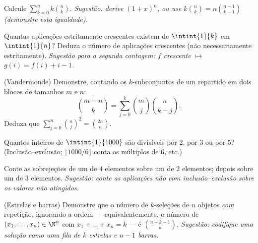 \begin{exercise}[$\star$]\label{exo:b1:counting:5}
Calcule $\sum_{k=0}^{n} k \binom{n}{k}$. \emph{Sugestão: derive
$(1 + x)^n$, ou use $k \binom nk = n \binom{n-1}{k-1}$ (demonstre esta igualdade).}
\end{exercise}

\begin{exercise}[$\star\star$]\label{exo:b1:counting:6}
Quantas aplicações estritamente crescentes existem de $\intint{1}{k}$ em $\intint{1}{n}$? Deduza o número de aplicações
crescentes (não necessariamente estritamente). \emph{Sugestão para a
segunda contagem: $f$ crescente $\mapsto$ $g(i) = f(i) + i - 1$.}
\end{exercise}

\begin{exercise}[$\star\star$]\label{exo:b1:counting:7}
(Vandermonde) Demonstre, contando os $k$-subconjuntos de um 
repartido em dois blocos de tamanhos $m$ e $n$:
\[
\binom{m+n}{k} = \sum_{j=0}^{k} \binom{m}{j} \binom{n}{k-j} .
\]
Deduza que $\sum_{j=0}^{n} \binom nj^2 = \binom{2n}{n}$.
\end{exercise}

\begin{exercise}[$\star\star$]\label{exo:b1:counting:8}
Quantos inteiros de $\intint{1}{1000}$ são divisíveis por
$2$, por $3$ ou por $5$? (Inclusão--exclusão; $\lfloor 1000/6 \rfloor$
conta os múltiplos de $6$, etc.)
\end{exercise}

\begin{exercise}[$\star\star$]\label{exo:b1:counting:9}
Conte as sobrejeções de um  de $4$ elementos sobre um 
de $2$ elementos; depois sobre um  de $3$ elementos.
\emph{Sugestão: conte as aplicações não  com
inclusão--exclusão sobre os valores não atingidos.}
\end{exercise}

\begin{exercise}[$\star\star$]\label{exo:b1:counting:10}
(Estrelas e barras) Demonstre que o número de $k$-seleções de $n$
objetos \emph{com} repetição, ignorando a ordem --- equivalentemente, o
número de $(x_1, \dots, x_n) \in \N^n$ com $x_1 + \dots + x_n = k$ --- é $\binom{n + k - 1}{k}$. \emph{Sugestão: codifique uma solução como uma fila
de $k$ estrelas e $n - 1$ barras.}
\end{exercise}


